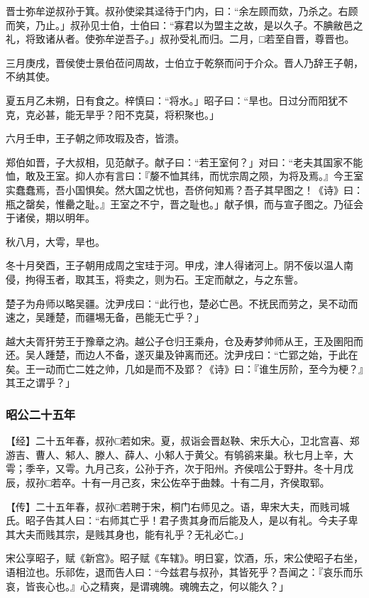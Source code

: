 \documentclass[]{article}
\begin{document}
晋士弥牟逆叔孙于箕。叔孙使梁其迳待于门内，曰：``余左顾而欬，乃杀之。右顾而笑，乃止。」叔孙见士伯，士伯曰：``寡君以为盟主之故，是以久子。不腆敝邑之礼，将致诸从者。使弥牟逆吾子。」叔孙受礼而归。二月，□若至自晋，尊晋也。

三月庚戌，晋侯使士景伯莅问周故，士伯立于乾祭而问于介众。晋人乃辞王子朝，不纳其使。

夏五月乙未朔，日有食之。梓慎曰：``将水。」昭子曰：``旱也。日过分而阳犹不克，克必甚，能无旱乎？阳不克莫，将积聚也。」

六月壬申，王子朝之师攻瑕及杏，皆溃。

郑伯如晋，子大叔相，见范献子。献子曰：``若王室何？」对曰：``老夫其国家不能恤，敢及王室。抑人亦有言曰：『嫠不恤其纬，而忧宗周之陨，为将及焉。』今王室实蠢蠢焉，吾小国惧矣。然大国之忧也，吾侪何知焉？吾子其早图之！《诗》曰：瓶之罄矣，惟罍之耻。』王室之不宁，晋之耻也。」献子惧，而与宣子图之。乃征会于诸侯，期以明年。

秋八月，大雩，旱也。

冬十月癸酉，王子朝用成周之宝珪于河。甲戌，津人得诸河上。阴不佞以温人南侵，拘得玉者，取其玉，将卖之，则为石。王定而献之，与之东訾。

楚子为舟师以略吴疆。沈尹戌曰：``此行也，楚必亡邑。不抚民而劳之，吴不动而速之，吴踵楚，而疆埸无备，邑能无亡乎？」

越大夫胥犴劳王于豫章之汭。越公子仓归王乘舟，仓及寿梦帅师从王，王及圉阳而还。吴人踵楚，而边人不备，遂灭巢及钟离而还。沈尹戌曰：``亡郢之始，于此在矣。王一动而亡二姓之帅，几如是而不及郢？《诗》曰：『谁生厉阶，至今为梗？』其王之谓乎？」

\hypertarget{header-n2767}{%
\subsubsection{昭公二十五年}\label{header-n2767}}

【经】二十五年春，叔孙□若如宋。夏，叔诣会晋赵鞅、宋乐大心，卫北宫喜、郑游吉、曹人、邾人、滕人、薛人、小邾人于黄父。有鸲鹆来巢。秋七月上辛，大雩；季辛，又雩。九月己亥，公孙于齐，次于阳州。齐侯唁公于野井。冬十月戊辰，叔孙□若卒。十有一月己亥，宋公佐卒于曲棘。十有二月，齐侯取郓。

【传】二十五年春，叔孙□若聘于宋，桐门右师见之。语，卑宋大夫，而贱司城氏。昭子告其人曰：``右师其亡乎！君子贵其身而后能及人，是以有礼。今夫子卑其大夫而贱其宗，是贱其身也，能有礼乎？无礼必亡。」

宋公享昭子，赋《新宫》。昭子赋《车辖》。明日宴，饮酒，乐，宋公使昭子右坐，语相泣也。乐祁佐，退而告人曰：``今兹君与叔孙，其皆死乎？吾闻之：『哀乐而乐哀，皆丧心也。』心之精爽，是谓魂魄。魂魄去之，何以能久？」
\end{document}
